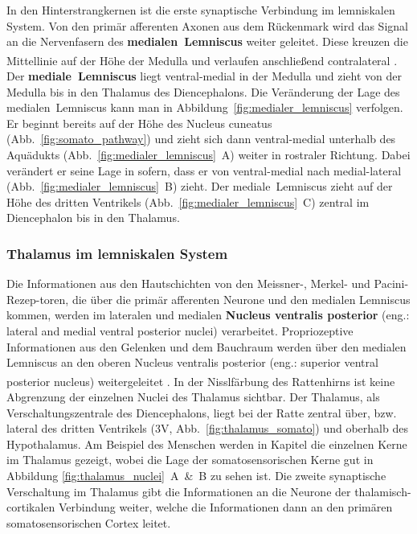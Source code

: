 In den Hinterstrangkernen ist die erste synaptische Verbindung im lemniskalen System. Von den primär afferenten Axonen aus dem Rückenmark wird das Signal an die Nervenfasern des \textbf{medialen~Lemniscus}  weiter geleitet. Diese kreuzen die Mittellinie auf der Höhe der Medulla und verlaufen anschließend contralateral \textsuperscript{\cite[Kap.~22]{kandel2013principles}}. 
Der \textbf{mediale~Lemniscus} liegt ventral-medial in der Medulla und zieht von der Medulla bis in den Thalamus des Diencephalons. Die Veränderung der Lage des medialen~Lemniscus  kann man in Abbildung~\ref{fig:medialer_lemniscus} verfolgen. Er beginnt bereits auf der Höhe des Nucleus cuneatus (Abb.~\ref{fig:somato_pathway}) und zieht sich dann ventral-medial unterhalb des Aquädukts (Abb.~\ref{fig:medialer_lemniscus}~A) weiter in rostraler Richtung. Dabei verändert er seine Lage in sofern, dass er von ventral-medial nach medial-lateral (Abb.~\ref{fig:medialer_lemniscus}~B) zieht. Der mediale~Lemniscus zieht auf der Höhe des dritten Ventrikels (Abb.~\ref{fig:medialer_lemniscus}~C) zentral im Diencephalon bis in den Thalamus.

\subsubsection*{Thalamus im lemniskalen System}
Die Informationen aus den Hautschichten von den Meissner-, Merkel- und Pacini-Rezep-toren, die über die primär afferenten Neurone und den medialen Lemniscus kommen, werden im lateralen und medialen \textbf{Nucleus ventralis posterior} (eng.: lateral and medial
ventral posterior nuclei)  verarbeitet. Propriozeptive Informationen aus den Gelenken und dem Bauchraum werden über den medialen Lemniscus an den oberen Nucleus ventralis posterior (eng.: superior ventral posterior nucleus) weitergeleitet \textsuperscript{\cite[Kap.~22]{kandel2013principles}}. 
In der Nisslfärbung des Rattenhirns ist keine Abgrenzung der einzelnen Nuclei des Thalamus sichtbar. Der Thalamus, als Verschaltungszentrale des Diencephalons, liegt bei der Ratte zentral über, bzw. lateral des dritten Ventrikels (3V, Abb.~\ref{fig:thalamus_somato}) und oberhalb des Hypothalamus. 
Am Beispiel des Menschen werden in Kapitel \label{subsubsec:thalamus} die einzelnen Kerne im Thalamus gezeigt, wobei die Lage der somatosensorischen Kerne gut in Abbildung \ref{fig:thalamus_nuclei}~A~\&~B zu sehen ist.
Die zweite synaptische Verschaltung im Thalamus gibt die Informationen an die Neurone der thalamisch-cortikalen Verbindung weiter, welche die Informationen dann an den primären somatosensorischen Cortex leitet.

